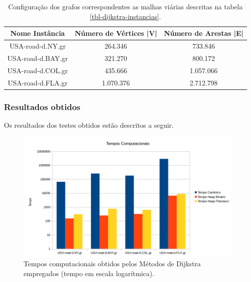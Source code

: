 \begin{table}[H]
\caption{Configuração dos grafos correspondentes as malhas viárias descritas na tabela \ref{tbl-dijkstra-instancias}.}
\label{tbl-dijkstra-configuracao}
\centering
\begin{adjustbox}{max width=\textwidth}
\begin{tabular}{|c|c|c|}
\hline 
\textbf{Nome Instância} & \textbf{Número de Vértices |V|} & \textbf{Número de Arestas |E|} \\ 
\hline 
USA-road-d.NY.gr
 & 264.346
 & 733.846
 \\ 
\hline 
USA-road-d.BAY.gr
 & 321.270
 & 800.172
 \\ 
\hline 
USA-road-d.COL.gr
 & 435.666
 & 1.057.066
 \\ 
\hline 
USA-road-d.FLA.gr
 & 1.070.376
 & 2.712.798
 \\ 
\hline 
\end{tabular}
\end{adjustbox} 
\end{table}

\subsubsection{Resultados obtidos}
\label{sec-dijkstra-experimentos-resultados}
Os resultados dos testes obtidos estão descritos a seguir.

\begin{figure}[H]
\centering
\includegraphics[width=.90\textwidth]{figuras/dijkstra-tempos} 
\caption{Tempos computacionais obtidos pelos Métodos de Dijkstra empregados (tempo em escala logarítmica).}
\label{fig-dijkstra-resultados-tempos}
\end{figure}


